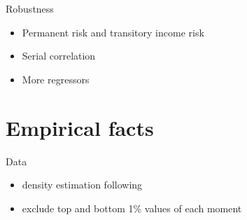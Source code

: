 \documentclass{beamer}
\begin{document}
\begin{frame}{Robustness}
	\begin{itemize}
		\item Permanent risk and transitory income risk 
		\item Serial correlation 
		\item More regressors 
	\end{itemize}
\end{frame}



\section{Empirical facts}


\begin{frame}{Data}
	\begin{table}
		\centering
		\caption{Survey of Consumer Expectations}
		\label{SCE_data_sum}
	\end{table}
	\begin{itemize}
		\item density estimation following \cite{engelberg_comparing_2009}
		\item exclude top and bottom 1\% values of each moment
	\end{itemize}
\end{frame}
\end{document}
